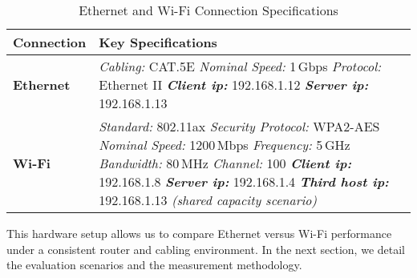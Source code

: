         \begin{table}[ht]
            \small
            \centering
            \begin{tabular}{@{}l p{}@{}}
            \toprule
            \textbf{Connection} & \textbf{Key Specifications} \\
            \midrule
            \textbf{Ethernet} 
                & \textit{Cabling:}          CAT.5E \newline
                \textit{Nominal Speed:}      1\,Gbps      \hspace{2em}   \textit{Protocol:}           Ethernet II \newline
                \textbf{\textit{Client ip:}} 192.168.1.12 \hspace{1.9em} \textbf{\textit{Server ip:}} 192.168.1.13 \\ 
            \midrule
            \textbf{Wi-Fi} 
                & \textit{Standard:}         802.11ax    \hspace{3.6em}  \textit{Security Protocol:}   WPA2-AES \newline
                \textit{Nominal Speed:}      1200\,Mbps  \hspace{0.5em}  \textit{Frequency:}           5\,GHz \newline
                \textit{Bandwidth:}          80\,MHz     \hspace{3.25em} \textit{Channel:}             100 \newline
                \textbf{\textit{Client ip:}} 192.168.1.8 \hspace{2.4em}   \textbf{\textit{Server ip:}} 192.168.1.4 \newline
                \textbf{\textit{Third host ip:}} 192.168.1.13 \textit{ (shared capacity scenario)} \\
            \bottomrule
            \end{tabular}
            \vspace{0.5cm}
            \caption{Ethernet and Wi-Fi Connection Specifications}
            \label{tab:connection-specs}
        \end{table}

        \vspace{-0.3cm} %

        \noindent This hardware setup allows us to compare Ethernet versus Wi-Fi performance under a consistent router and cabling environment. 
        In the next section, we detail the evaluation scenarios and the measurement methodology.

